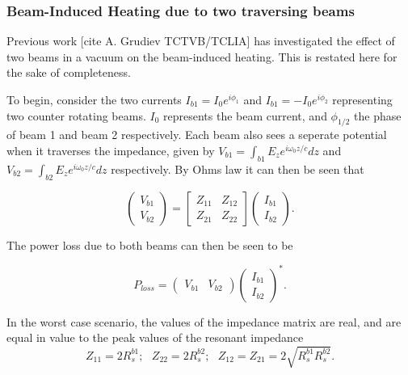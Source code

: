 \subsubsection{Beam-Induced Heating due to two traversing beams}

Previous work [cite A. Grudiev TCTVB/TCLIA] has investigated the effect of two beams in a vacuum on the beam-induced heating. This is restated here for the sake of completeness.

To begin, consider the two currents $I_{b1} = I_{0}e^{i\phi_{1}}$ and $I_{b1} = -I_{0}e^{i\phi_{2}}$ representing two counter rotating beams. $I_{0}$ represents the beam current, and $\phi_{1/2}$ the phase of beam 1 and beam 2 respectively. Each beam also sees a seperate potential when it traverses the impedance, given by $V_{b1} = \int_{b1} E_{z} e^{i\omega_{0}z/c} dz$ and $V_{b2} = \int_{b2} E_{z} e^{i\omega_{0}z/c} dz$ respectively. By Ohms law it can then be seen that

\begin{equation}
\begin{pmatrix}
V_{b1} \\
V_{b2}
\end{pmatrix}
=
\begin{bmatrix}
Z_{11} & Z_{12} \\
Z_{21} & Z_{22}
\end{bmatrix}
\begin{pmatrix}
I_{b1} \\
I_{b2}
\end{pmatrix}.
\end{equation}

The power loss due to both beams can then be seen to be

\begin{equation}
P_{loss} = \begin{pmatrix}
V_{b1} & V_{b2}
\end{pmatrix}
\begin{pmatrix}
I_{b1} \\
I_{b2}
\end{pmatrix}^{*}.
\end{equation}

In the worst case scenario, the values of the impedance matrix are real, and are equal in value to the peak values of the resonant impedance
\begin{equation}
Z_{11} = 2R^{b1}_{s};\text{    } Z_{22} = 2R^{b2}_{s};\text{    }  Z_{12} = Z_{21} = 2 \sqrt{R^{b1}_{s}R^{b2}_{s}}.
\end{equation}

